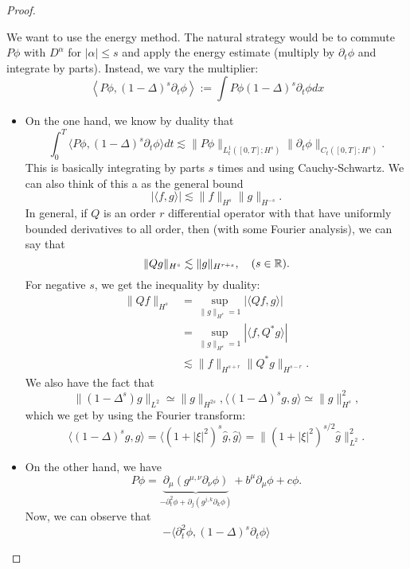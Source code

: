 \begin{proof}
\begin{itemize}
    We want to use the energy method. The natural strategy would be to commute $P\phi$ with $D^\alpha$ for $|\alpha|\le s$ and apply the energy estimate (multiply by $\partial_t \phi$ and integrate by parts). Instead, we vary the multiplier: 
    \[
        \left\langle P \phi,(1-\Delta)^{s} \partial_{t} \phi\right\rangle:=\int P \phi(1-\Delta)^{s} \partial_{t} \phi d x
    \]
    \begin{itemize}
        \item On the one hand, we know by duality that 
        \[
            \int_0^T \langle P\phi, (1-\Delta)^s \partial_t \phi \rangle dt  \lesssim 
            \| P\phi\|_{L_t^1([0,T]; H^s)} \|\partial_t\phi\|_{C_t([0,T]; H^s)}. 
        \]
        This is basically integrating by parts $s$ times and using Cauchy-Schwartz. We can also think of this a as the general bound 
        \[
            |\langle f,g \rangle | \lesssim \|f\|_{H^s}\|g\|_{H^{-s}}. 
        \]
        In general, if $Q$ is an order $r$ differential operator with that have uniformly bounded derivatives to all order, then (with some Fourier analysis), we can say that 
        \[
            \|Qg\|_{H^s}
            \lesssim 
            \|g\|_{H^{r+s}}, \quad (s\in \mathbb{R}).  
        \]
        For negative $s$, we get the inequality by duality: 
        \begin{align*}
            \|Qf\|_{H^s}
            &= 
            \sup_{\|g\|_{H^s} = 1} |\langle Qf, g \rangle | \\ 
            &= 
            \sup_{\|g\|_{H^s} = 1} |\langle f, Q^*g \rangle | \\ 
            &\lesssim 
            \|f\|_{H^{s+r}} \|Q^*g\|_{H^{s-r}}.     
        \end{align*}
        We also have the fact that 
        \[
            \|(1-\Delta^s)g \|_{L^2} \simeq \|g\|_{H^{2s}}, \langle  (1-\Delta)^s g,g \rangle \simeq \|g\|_{H^s}^2,      
        \] 
        which we get by using the Fourier transform: 
        \[
            \langle (1-\Delta)^s g,g \rangle 
            = 
            \langle (1+|\xi|^2)^s \hat g, \hat g \rangle  
            = 
            \|(1+|\xi|^2)^{s/2} \hat g\|_{L^2}^2. 
        \]
        \item 
        On the other hand, we have 
        \[
            P\phi = \underbrace{\partial_\mu (g^{\mu, \nu} \partial_\nu \phi)}_{-\partial_t^2 \phi + \partial_j (g^{j,k}\partial_k \phi)} + b^\mu \partial_\mu \phi + c\phi . 
        \]
        Now, we can observe that 
        \[
            -\langle \partial_t^2 \phi, (1-\Delta)^s \partial_t \phi \rangle 
\]
\end{itemize}
\end{itemize}
\end{proof}
